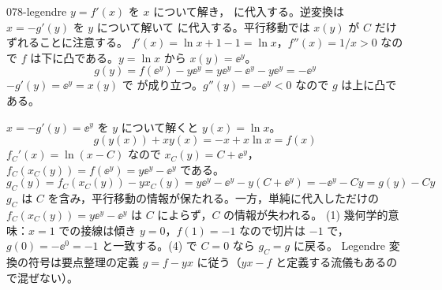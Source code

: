 \documentclass[uplatex,dvipdfmx,a4paper,11pt]{jsarticle}
\begin{document}
\begin{kaisetsu}{078-legendre}
\houshin $y = f'(x)$ を $x$ について解き， に代入する。逆変換は $x = -g'(y)$ を $y$ について解いて  に代入する。平行移動では $x(y)$ が $C$ だけずれることに注意する。
\keisan {} $f'(x) = \ln x + 1 - 1 = \ln x$，$f''(x) = 1/x > 0$ なので $f$ は下に凸である。$y = \ln x$ から $x(y) = \ee^{y}$。
\[ g(y) = f(\ee^{y}) - y\ee^{y} = y\ee^{y} - \ee^{y} - y\ee^{y} = -\ee^{y} \]
 $-g'(y) = \ee^{y} = x(y)$ で  が成り立つ。$g''(y) = -\ee^{y} < 0$ なので $g$ は上に凸である。

 $x = -g'(y) = \ee^{y}$ を $y$ について解くと $y(x) = \ln x$。
\[ g(y(x)) + xy(x) = -x + x\ln x = f(x) \]
 $f_{C}'(x) = \ln(x - C)$ なので $x_{C}(y) = C + \ee^{y}$，$f_{C}(x_{C}(y)) = f(\ee^{y}) = y\ee^{y} - \ee^{y}$ である。
\[ g_{C}(y) = f_{C}(x_{C}(y)) - yx_{C}(y) = y\ee^{y} - \ee^{y} - y(C + \ee^{y}) = -\ee^{y} - Cy = g(y) - Cy \]
$g_{C}$ は $C$ を含み，平行移動の情報が保たれる。一方，単純に代入しただけの $f_{C}(x_{C}(y)) = y\ee^{y} - \ee^{y}$ は $C$ によらず，$C$ の情報が失われる。
\kenzan (1) 幾何学的意味：$x = 1$ での接線は傾き $y = 0$，$f(1) = -1$ なので切片は $-1$ で，$g(0) = -\ee^{0} = -1$ と一致する。(4) で $C = 0$ なら $g_{C} = g$ に戻る。
\tsumazuki Legendre 変換の符号は要点整理の定義 $g = f - yx$ に従う（$yx - f$ と定義する流儀もあるので混ぜない）。
\end{kaisetsu}
\end{document}
